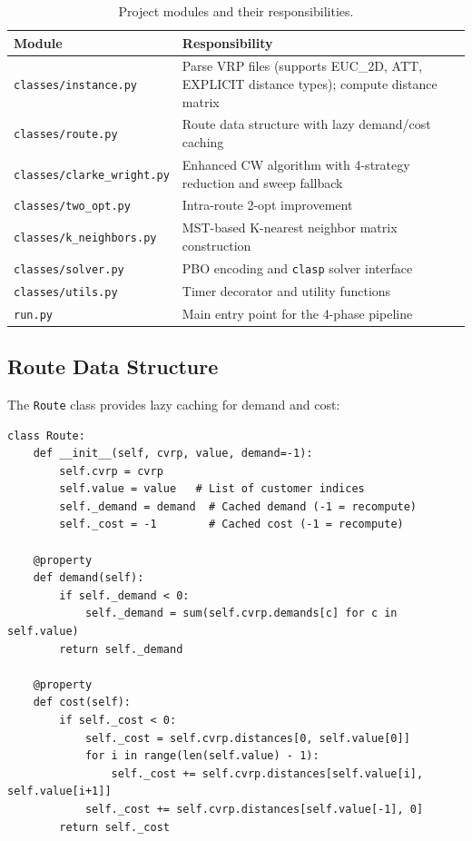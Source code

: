 \documentclass[12pt,a4paper]{article}
\theoremstyle{definition}
\begin{document}
\begin{table}[H]
\centering
\begin{tabular}{lp{9cm}}
\toprule
\textbf{Module} & \textbf{Responsibility} \\
\midrule
\texttt{classes/instance.py} & Parse VRP files (supports EUC\_2D, ATT, EXPLICIT distance types); compute distance matrix \\
\texttt{classes/route.py} & Route data structure with lazy demand/cost caching \\
\texttt{classes/clarke\_wright.py} & Enhanced CW algorithm with 4-strategy reduction and sweep fallback \\
\texttt{classes/two\_opt.py} & Intra-route 2-opt improvement \\
\texttt{classes/k\_neighbors.py} & MST-based K-nearest neighbor matrix construction \\
\texttt{classes/solver.py} & PBO encoding and \texttt{clasp} solver interface \\
\texttt{classes/utils.py} & Timer decorator and utility functions \\
\texttt{run.py} & Main entry point for the 4-phase pipeline \\
\bottomrule
\end{tabular}
\caption{Project modules and their responsibilities.}
\end{table}

\subsection{Route Data Structure}

The \texttt{Route} class provides lazy caching for demand and cost:

\begin{lstlisting}[caption={Route class with lazy caching}]
class Route:
    def __init__(self, cvrp, value, demand=-1):
        self.cvrp = cvrp
        self.value = value   # List of customer indices
        self._demand = demand  # Cached demand (-1 = recompute)
        self._cost = -1        # Cached cost (-1 = recompute)
    
    @property
    def demand(self):
        if self._demand < 0:
            self._demand = sum(self.cvrp.demands[c] for c in self.value)
        return self._demand
    
    @property
    def cost(self):
        if self._cost < 0:
            self._cost = self.cvrp.distances[0, self.value[0]]
            for i in range(len(self.value) - 1):
                self._cost += self.cvrp.distances[self.value[i], self.value[i+1]]
            self._cost += self.cvrp.distances[self.value[-1], 0]
        return self._cost
\end{lstlisting}
\end{document}
